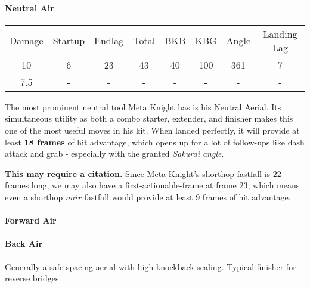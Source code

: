 \paragraph{Neutral Air}
\begin{center}
	\begin{tabular}{| c | c  c  c | c  c  c | c |}
		\hline
		Damage &	Startup	& Endlag & Total & BKB & KBG & Angle &	Landing Lag	\\
		10	&	6	&	23	&	43	&	40	&	100 & 	361\deg	&	7 		\\
		7.5	&	-	&	-	&	-	&	- 	& 	- 	&	-		&	-		\\
		\hline
	\end{tabular}
\end{center}
The most prominent neutral tool Meta Knight has is his Neutral Aerial. Its simultaneous utility as both a combo starter, extender, and finisher makes this one of the most useful moves in his kit. When landed perfectly, it will provide at least \textbf{18 frames} of hit advantage, which opens up for a lot of follow-ups like dash attack and grab - especially with the granted \textit{Sakurai angle}. 

\textbf{This may require a citation.} Since Meta Knight's shorthop fastfall is $22$ frames long, we may also have a first-actionable-frame at frame $23$, which means even a shorthop $nair$ fastfall would provide at least 9 frames of hit advantage.
\paragraph{Forward Air}
\paragraph{Back Air}
Generally a safe spacing aerial with high knockback scaling. Typical finisher for reverse bridges.
